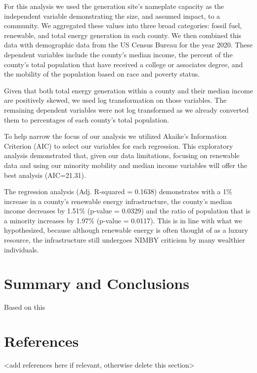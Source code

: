 \documentclass[
  12pt,
]{article}
\begin{document}
For this analysis we used the generation site's nameplate capacity as
the independent variable demonstrating the size, and assumed impact, to
a community. We aggregated these values into three broad categories:
fossil fuel, renewable, and total energy generation in each county. We
then combined this data with demographic data from the US Census Bureau
for the year 2020. These dependent variables include the county's median
income, the percent of the county's total population that have received
a college or associates degree, and the mobility of the population based
on race and poverty status.

Given that both total energy generation within a county and their median
income are positively skewed, we used log transformation on those
variables. The remaining dependent variables were not log transformed as
we already converted them to percentages of each county's total
population.

To help narrow the focus of our analysis we utilized Akaike's
Information Criterion (AIC) to select our variables for each regression.
This exploratory analysis demonstrated that, given our data limitations,
focusing on renewable data and using our minority mobility and median
income variables will offer the best analysis (AIC=21.31).

The regression analysis (Adj. R-squared = 0.1638) demonstrates with a
1\% increase in a county's renewable energy infrastructure, the county's
median income decreases by 1.51\% (p-value = 0.0329) and the ratio of
population that is a minority increases by 1.97\% (p-value = 0.0117).
This is in line with what we hypothesized, because although renewable
energy is often thought of as a luxury resource, the infrastructure
still undergoes NIMBY criticism by many wealthier individuals.

\newpage

\hypertarget{summary-and-conclusions}{%
\section{Summary and Conclusions}\label{summary-and-conclusions}}

Based on this

\newpage

\hypertarget{references}{%
\section{References}\label{references}}

\textless add references here if relevant, otherwise delete this
section\textgreater{}
\end{document}
